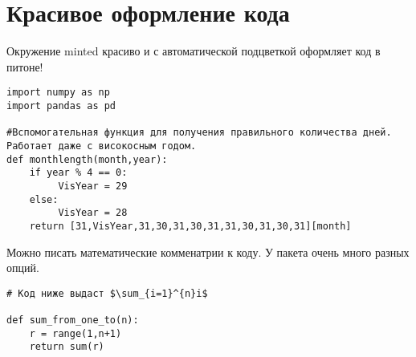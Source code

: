 \documentclass[12pt, a4paper]{article}
\begin{document}
\section{Красивое оформление кода}

Окружение minted красиво и с автоматической подцветкой оформляет код в питоне!

\begin{verbatim}
import numpy as np
import pandas as pd

#Вспомогательная функция для получения правильного количества дней. Работает даже с високосным годом.
def monthlength(month,year):
    if year % 4 == 0:
         VisYear = 29
    else:
         VisYear = 28
    return [31,VisYear,31,30,31,30,31,31,30,31,30,31][month]
\end{verbatim}

Можно писать математические комменатрии к коду. У пакета очень много разных опций.

\begin{verbatim}
# Код ниже выдаст $\sum_{i=1}^{n}i$

def sum_from_one_to(n):
    r = range(1,n+1)
    return sum(r)
\end{verbatim}
\end{document}
